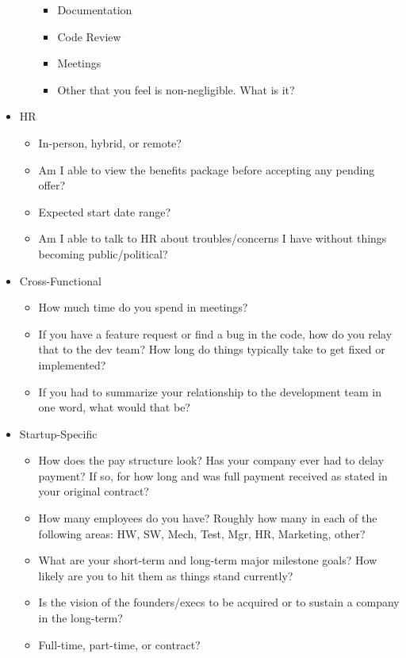 \documentclass{article}
\begin{document}
\begin{itemize}
\begin{itemize}
\begin{itemize}
			            \item Documentation
			            \item Code Review
			            \item Meetings
			            \item Other that you feel is non-negligible. What is it?
		            \end{itemize}
	      \end{itemize}
	\item HR
	      \begin{itemize}
		      \item In-person, hybrid, or remote?
		      \item Am I able to view the benefits package before accepting any pending offer?
		      \item Expected start date range?
		      \item Am I able to talk to HR about troubles/concerns I have without things becoming public/political?
	      \end{itemize}
	\item Cross-Functional
	      \begin{itemize}
		      \item How much time do you spend in meetings?
		      \item If you have a feature request or find a bug in the code, how do you relay that to the dev team? How long do things typically take to get fixed or implemented?
		      \item If you had to summarize your relationship to the development team in one word, what would that be?
	      \end{itemize}
	\item Startup-Specific
	      \begin{itemize}
		      \item How does the pay structure look? Has your company ever had to delay payment? If so, for how long and was full payment received as stated in your original contract?
		      \item How many employees do you have? Roughly how many in each of the following areas: HW, SW, Mech, Test, Mgr, HR, Marketing, other?
		      \item What are your short-term and long-term major milestone goals? How likely are you to hit them as things stand currently?
		      \item Is the vision of the founders/execs to be acquired or to sustain a company in the long-term?
		      \item Full-time, part-time, or contract?

\end{itemize}
\end{itemize}
\end{document}
